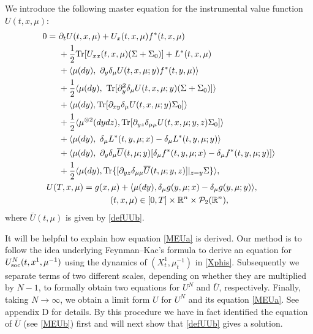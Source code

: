 \documentclass{amsart}
\theoremstyle{definition}
\theoremstyle{remark}
\def\cal{\mathcal}
\numberwithin{equation}{section}
\begin{document}
We introduce the following master equation for the instrumental value  function $U(t,x,\mu)$:
\begin{align}
0=\ &\partial_t U(t, x,\mu) + U_x(t,x,\mu) f^*(t,x,\mu)  \label{MEUa}   \\
&+ \frac{1}{2}{\rm Tr}[  U_{xx}(t, x, \mu)
(\Sigma+\Sigma_0)]+L^*(t, x, \mu)\notag \\
 & + \langle \mu(dy), \ \partial_y\delta_\mu U(t,x,\mu;y) f^*(t,y,\mu)\rangle \nonumber \\
& +\frac12 \langle \mu(dy), \   {\rm Tr}[ \partial_{y}^2 \delta_\mu U(t,x,\mu; y)( \Sigma  +\Sigma_0)]\rangle \nonumber \\
& + \langle \mu(dy),   \mbox{Tr}[ \partial_{xy} \delta_\mu U(t, x, \mu; y) \Sigma_0] \rangle   \notag  \\
& +\frac12 \langle \mu^{\otimes2}(dydz), \mbox{Tr}[ \partial_{yz}  \delta_{\mu\mu} U(t, x, \mu; y,z) \Sigma_0 ]     \rangle    \notag   \\
 & + \langle \mu(dy) , \   \delta_\mu L^* (t,y,\mu; x) - \delta_\mu L^*(t,y,\mu; y) \rangle \nonumber  \\
 & + \langle \mu(dy) , \  \partial_y\delta_\mu \overline U(t,\mu;y)    [\delta_\mu f^* (t,y,\mu; x) - \delta_\mu f^*(t,y,\mu; y)] \rangle \nonumber \\
  &+   \frac{1}{2}\langle \mu(dy),    \mbox{Tr}\{ [\partial_{yz}
\delta_{\mu\mu}
\overline U(t,\mu;y, z)]|_{z=y}\Sigma\}\rangle \notag,\\
&\hskip -0.5cm U(T, x, \mu)= g(x, \mu) + \langle \mu(dy), \delta_\mu g(y,\mu; x)- \delta_\mu g(y,\mu; y)  \rangle  ,  \label{UTm}  \\
&\qquad\qquad \qquad(t,x,\mu)\in[0,T]\times \mathbb{R}^n\times
 {\cal P}_2(\mathbb{R}^n),\notag
\end{align}
where $\overline U(t,\mu)$ is given by \eqref{defUUb}.



It will be helpful to explain how equation
\eqref{MEUa} is derived.
Our method is to follow the idea underlying Feynman--Kac's formula to derive an equation for
$U_{\rm soc}^{N}(t,x^1, \mu^{-1}) $  using the dynamics of $(X_t^1, \mu_t^{-1})$ in \eqref{Xphis}. Subsequently we separate terms of two different scales, depending on whether they are multiplied by $N-1$, to formally obtain two equations for $U^{N}$ and $\overline U$, respectively. Finally, taking $N\to \infty$, we obtain a limit form $U$ for $U^N$ and its  equation \eqref{MEUa}. See appendix D for details. By this procedure we have in fact identified the equation of $\overline U$ (see \eqref{MEUb}) first and will next show that \eqref{defUUb} gives a solution.
\end{document}
